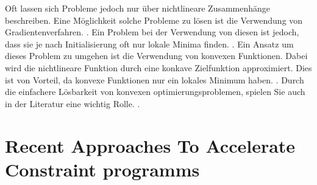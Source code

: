 Oft lassen sich Probleme jedoch nur über nichtlineare Zusammenhänge beschreiben.
Eine Möglichkeit solche Probleme zu lösen ist die Verwendung von
Gradientenverfahren. \cite[153]{marti21bo}. Ein Problem bei der Verwendung von
diesen ist jedoch, dass sie je nach Initialisierung oft nur lokale Minima
finden. \cite[9]{boyd04bo}. Ein Ansatz um dieses Problem zu umgehen ist die
Verwendung von konvexen Funktionen. Dabei wird die nichtlineare Funktion durch
eine konkave Zielfunktion approximiert. \cite[11]{boyd04bo} Dies ist von
Vorteil, da konvexe Funktionen nur ein lokales Minimum haben.
\cite[7]{noced06bo}. Durch die einfachere Lösbarkeit von konvexen
optimierungsproblemen, spielen Sie auch in der Literatur eine wichtig Rolle.
\cite[8]{boyd04bo}. 


\section{Recent Approaches To Accelerate Constraint programms}
\label{sec:Recent Approaches To Accelerate Constraint programms}


